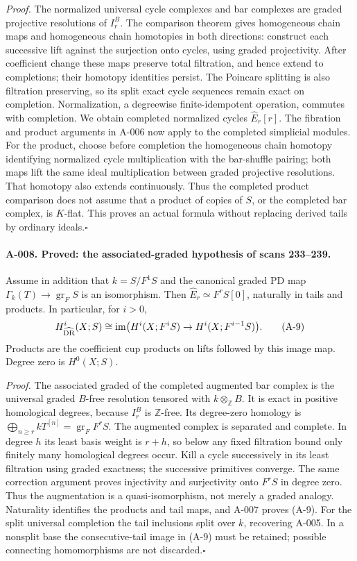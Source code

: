 \emph{Proof.}
The normalized universal cycle complexes and bar complexes are graded
projective resolutions of $I_r^B$. The comparison theorem gives
homogeneous chain maps and homogeneous chain homotopies in both
directions: construct each successive lift against the surjection onto
cycles, using graded projectivity. After coefficient change these
maps preserve total filtration, and hence extend to completions;
their homotopy identities persist. The Poincare splitting is also
filtration preserving, so its split exact cycle sequences remain
exact on completion. Normalization, a degreewise finite-idempotent
operation, commutes with completion. We obtain completed normalized
cycles $\widehat E_r[r]$. The fibration and product arguments in
A-006 now apply to the completed simplicial modules. For the product,
choose before completion the homogeneous chain homotopy identifying
normalized cycle multiplication with the bar-shuffle pairing; both
maps lift the same ideal multiplication between graded projective
resolutions. That homotopy also extends continuously. Thus the
completed product comparison does not assume that a product of
copies of $S$, or the completed bar complex, is $K$-flat.
This proves an actual formula without replacing derived tails by
ordinary ideals.\hfill$\square$

\paragraph{A-008. Proved: the associated-graded hypothesis of scans
233--239.}
Assume in addition that $k=S/F^1S$ and the canonical graded PD map
$\Gamma_k(T)\to\operatorname{gr}_F S$ is an isomorphism. Then
$\widehat E_r\simeq F^rS[0]$, naturally in tails and products.
In particular, for $i>0$,
\[
 H^i_{\widehat{\mathrm{DR}}}(X;S)\cong
 \operatorname{im}\bigl(H^i(X;F^iS)\to H^i(X;F^{i-1}S)\bigr).
 \tag{A-9}
\]
Products are the coefficient cup products on lifts followed by this
image map. Degree zero is $H^0(X;S)$.

\emph{Proof.}
The associated graded of the completed augmented bar complex is the
universal graded $B$-free resolution tensored with
$k\otimes_{\mathbb Z}B$. It is exact in positive homological
degrees, because $I_r^B$ is $\mathbb Z$-free. Its degree-zero
homology is $\bigoplus_{n\geq r}kT^{[n]}=\operatorname{gr}_F F^rS$.
The augmented complex is separated and complete. In degree $h$ its
least basis weight is $r+h$, so below any fixed filtration bound
only finitely many homological degrees occur. Kill a cycle successively
in its least filtration using graded exactness; the successive
primitives converge. The same correction argument proves injectivity
and surjectivity onto $F^rS$ in degree zero. Thus the augmentation
is a quasi-isomorphism, not merely a graded analogy. Naturality
identifies the products and tail maps, and A-007 proves (A-9).
For the split universal completion the tail inclusions split over $k$,
recovering A-005. In a nonsplit base the consecutive-tail image in
(A-9) must be retained; possible connecting homomorphisms are not
discarded.\hfill$\square$

